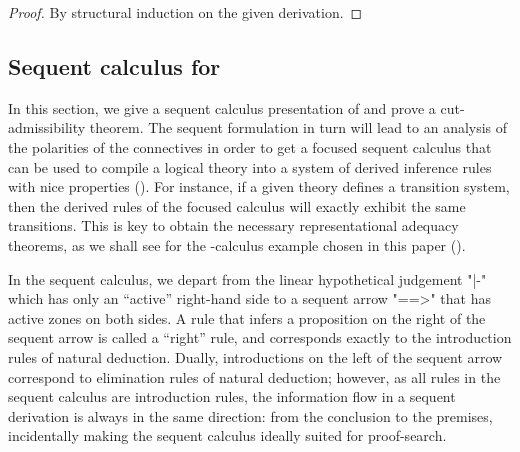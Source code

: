 \documentclass{article}
\begin{document}
\begin{proof}
  By structural induction on the given \hyll derivation.
\end{proof}

\subsection{Sequent calculus for \hyll}

In this section, we give a sequent calculus presentation of \hyll and prove a
cut-admissibility theorem.  The sequent formulation in turn will lead to an
analysis of the polarities of the connectives in order to get a focused sequent
calculus that can be used to compile a logical theory into a system of derived
inference rules with nice properties ().  For instance, if a
given theory defines a transition system, then the derived rules of the focused
calculus will exactly exhibit the same transitions. This is key to obtain the
necessary representational adequacy theorems,
as we shall see for the \spi-calculus example chosen in this paper (). 

In the sequent calculus, we depart from the linear hypothetical judgement "|-"
which has only an ``active'' right-hand side to a sequent arrow "==>" that has
active zones on both sides. A rule that infers a proposition on the right of the
sequent arrow is called a ``right'' rule, and corresponds exactly to the
introduction rules of natural deduction. Dually, introductions on the left of
the sequent arrow correspond to elimination rules of natural deduction; however,
as all rules in the sequent calculus are introduction rules, the information
flow in a sequent derivation is always in the same direction: from the
conclusion to the premises, incidentally making the sequent calculus ideally
suited for proof-search.
\end{document}
